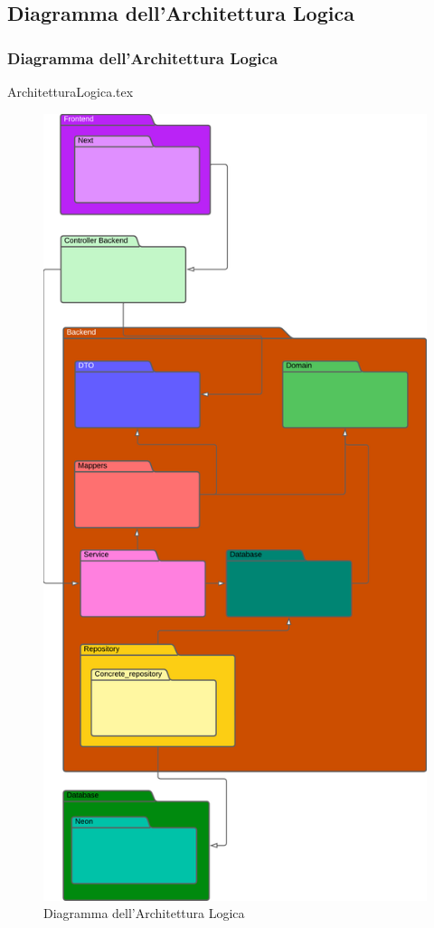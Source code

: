 \documentclass[12pt]{article}
\begin{document}
\subsection{Diagramma dell'Architettura Logica}

\subsubsection{Diagramma dell'Architettura Logica}
{ArchitetturaLogica.tex}

\begin{figure}[H]
    \includegraphics[width=\textwidth, height=\textheight,keepaspectratio]{Immagini/AL/Iterazione 2/ALArchitetturaLogica.png}
        \caption{Diagramma dell'Architettura Logica}
        \label{fig:diagrammaAL2}
\end{figure}
\end{document}
